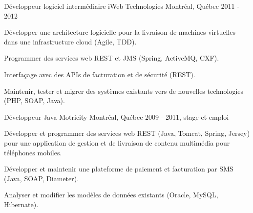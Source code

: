 \begin{cventries}
  \cventry
    {Développeur logiciel intermédiaire} %
    {iWeb Technologies} %
    {Montréal, Québec} %
    {2011 - 2012} %
    {
      \begin{cvitems} %
        \item {Développer une architecture logicielle pour la livraison de machines virtuelles dans une infrastructure cloud (Agile, TDD).}
        \item {Programmer des services web REST et JMS (Spring, ActiveMQ, CXF).}
        \item {Interfaçage avec des APIs de facturation et de sécurité (REST).}
        \item {Maintenir, tester et migrer des systèmes existants vers de nouvelles technologies (PHP, SOAP, Java).}
      \end{cvitems}
    }

  \cventry
    {Développeur Java} %
    {Motricity} %
    {Montréal, Québec} %
    {2009 - 2011, stage et emploi} %
    {
      \begin{cvitems} %
        \item {Développer et programmer des services web REST (Java, Tomcat, Spring, Jersey) pour une application de gestion et de livraison de contenu multimédia pour téléphones mobiles.}
        \item {Développer et maintenir une plateforme de paiement et facturation par SMS (Java, SOAP, Diameter).}
        \item {Analyser et modifier les modèles de données existants (Oracle, MySQL, Hibernate).}
      \end{cvitems}
    }


\end{cventries}
